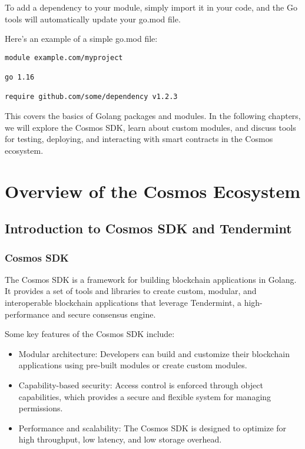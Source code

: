 \documentclass{article}
\begin{document}
To add a dependency to your module, simply import it in your code, and the Go tools will automatically update your go.mod file.

Here's an example of a simple go.mod file:

\begin{verbatim}
module example.com/myproject

go 1.16

require github.com/some/dependency v1.2.3
\end{verbatim}

This covers the basics of Golang packages and modules. In the following chapters, we will explore the Cosmos SDK, learn about custom modules, and discuss tools for testing, deploying, and interacting with smart contracts in the Cosmos ecosystem.
%
%
\section{Overview of the Cosmos Ecosystem}

\subsection{Introduction to Cosmos SDK and Tendermint}

\subsubsection{Cosmos SDK}

The Cosmos SDK is a framework for building blockchain applications in Golang. It provides a set of tools and libraries to create custom, modular, and interoperable blockchain applications that leverage Tendermint, a high-performance and secure consensus engine.

Some key features of the Cosmos SDK include:

\begin{itemize}
\item Modular architecture: Developers can build and customize their blockchain applications using pre-built modules or create custom modules.
\item Capability-based security: Access control is enforced through object capabilities, which provides a secure and flexible system for managing permissions.
\item Performance and scalability: The Cosmos SDK is designed to optimize for high throughput, low latency, and low storage overhead.
\end{itemize}
\end{document}
